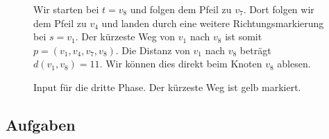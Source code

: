 \begin{example}
\begin{figure}[htb]
\begin{minipage}{0.5\textwidth}
\caption{Input für die dritte Phase. Der kürzeste Weg ist gelb markiert.}
\label{figure-dijkstra-bsp-phase-3}
\end{minipage}
\hfill
\begin{minipage}{0.45\textwidth}
	Wir starten bei $t = v_8$ und folgen dem Pfeil zu $v_7$. Dort folgen wir dem Pfeil zu $v_4$ und landen durch eine weitere Richtungsmarkierung bei $s = v_1$. Der kürzeste Weg von $v_1$ nach $v_8$ ist somit $p = (v_1, v_4, v_7, v_8)$. Die Distanz von $v_1$ nach $v_8$ beträgt $d(v_1, v_8) = 11$. Wir können dies direkt beim Knoten $v_8$ ablesen.
\end{minipage}
\end{figure}

\end{example}

\subsection{Aufgaben}
\label{subsection-aufgaben-routenplaner-dijkstra}

